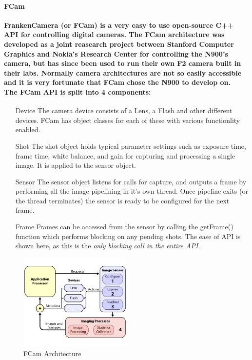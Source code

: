 \documentclass[11pt]{article} %
\begin{document}
\paragraph{\bf{FCam}}
\paragraph{FrankenCamera (or FCam) is a very easy to use open-source C++ API for controlling digital cameras.  The FCam architecture was developed as a joint reasearch project between Stanford Computer Graphics and Nokia's Research Center for controlling the N900's camera, but has since been used to run their own F2 camera built in their labs\cite{fcamdoc}. Normally camera architectures are not so easily accessible and it is very fortunate that FCam chose the N900 to develop on.
\\The FCam API is split into 4 components:}
\begin{enumerate}
\item[Device]{The camera device consists of a Lens, a Flash and other different devices. FCam has object classes for each of these with various functionlity enabled.}
\item[Shot]{The shot object holds typical parameter settings such as exposure time, frame time, white balance, and gain for capturing and processing a single image. It is applied to the sensor object.}
\item[Sensor]{The sensor object listens for calls for capture, and outputs a frame by performing all the image pipelining in it's own thread. Once pipeline exits (or the thread terminates) the sensor is ready to be configured for the next frame.}
\item[Frame]{Frames can be accessed from the sensor by calling the getFrame() function which performs blocking on any pending shots. The ease of API is shown here, as this is the \it{only} blocking call in the entire API.}
\end{enumerate}

\begin{figure}
	\vspace{-40pt}
	\begin{center}
		\includegraphics[width=0.5\textwidth]{images/fcam_arch}
	\end{center}
	\vspace{-20pt}
	\caption{FCam Architecture}
\end{figure}
\end{document}
